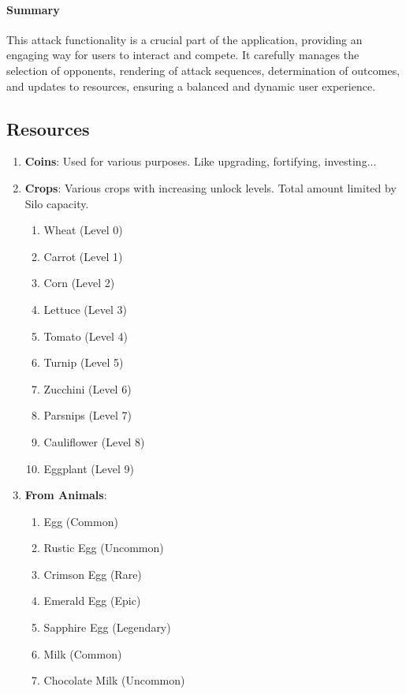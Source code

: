 \documentclass[12pt]{article}
\begin{document}
\paragraph{Summary}
This attack functionality is a crucial part of the application, providing an engaging way for users to interact and compete. It carefully manages the selection of opponents, rendering of attack sequences, determination of outcomes, and updates to resources, ensuring a balanced and dynamic user experience.





\subsection{Resources}

\begin{enumerate}
    \item \textbf{Coins}: Used for various purposes. Like upgrading, fortifying, investing...
    \item \textbf{Crops}: Various crops with increasing unlock levels. Total amount limited by Silo capacity.
    \begin{enumerate}
        \item Wheat (Level 0)
        \item Carrot (Level 1)
        \item Corn (Level 2)
        \item Lettuce (Level 3)
        \item Tomato (Level 4)
        \item Turnip (Level 5)
        \item Zucchini (Level 6)
        \item Parsnips (Level 7)
        \item Cauliflower (Level 8)
        \item Eggplant (Level 9)
    \end{enumerate}
    \item \textbf{From Animals}:
    \begin{enumerate}
        \item Egg (Common)
        \item Rustic Egg (Uncommon)
        \item Crimson Egg (Rare)
        \item Emerald Egg (Epic)
        \item Sapphire Egg (Legendary)
        \item Milk (Common)
        \item Chocolate Milk (Uncommon)

\end{enumerate}
\end{enumerate}
\end{document}
